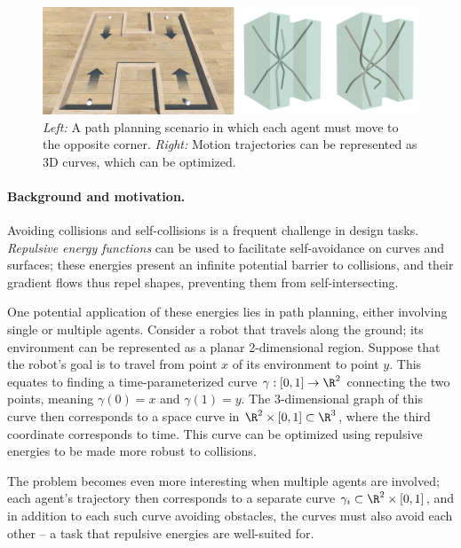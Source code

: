 \documentclass[11pt]{article}
\begin{document}

\thispagestyle{empty}

\begin{figure}[h]
\includegraphics[width=\textwidth]{pathplan.png}
\caption{\emph{Left:} A path planning scenario in which each agent must move to the opposite corner. \emph{Right:} Motion trajectories can be represented as 3D curves, which can be optimized.}
\end{figure}

\paragraph{Background and motivation.} Avoiding collisions and self-collisions is a frequent challenge in design tasks. \emph{Repulsive energy functions} can be used to facilitate self-avoidance on curves and surfaces; these energies present an infinite potential barrier to collisions, and their gradient flows thus repel shapes, preventing them from self-intersecting.

One potential application of these energies lies in path planning, either involving single or multiple agents. Consider a robot that travels along the ground; its environment can be represented as a planar 2-dimensional region. Suppose that the robot's goal is to travel from point $x$ of its environment to point $y$. This equates to finding a time-parameterized curve $\gamma : [0,1] \to \R^2$ connecting the two points, meaning $\gamma(0) = x$ and $\gamma(1) = y$. The 3-dimensional graph of this curve then corresponds to a space curve in $\R^2 \times [0,1] \subset \R^3$, where the third coordinate corresponds to time. This curve can be optimized using repulsive energies to be made more robust to collisions.

The problem becomes even more interesting when multiple agents are involved; each agent's trajectory then corresponds to a separate curve $\gamma_i \subset \R^2 \times [0,1]$, and in addition to each such curve avoiding obstacles, the curves must also avoid each other -- a task that repulsive energies are well-suited for.
\end{document}
